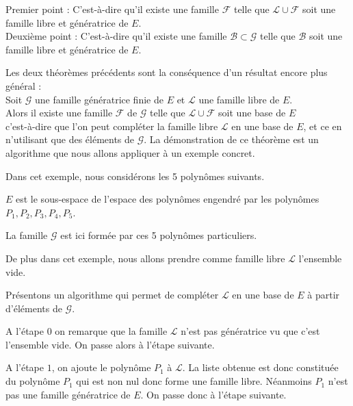 \change
Premier point :
  C'est-à-dire qu'il existe une famille $\mathcal{F}$ telle que 
  $\mathcal{L} \cup \mathcal{F}$ soit une famille libre et génératrice de $E$.\\
  
  
\change
Deuxième point :
  C'est-à-dire qu'il existe une famille $\mathcal{B} \subset \mathcal{G}$ telle que 
  $\mathcal{B}$ soit une famille libre et génératrice de $E$.

\diapo
Les deux théorèmes précédents sont la conséquence d'un résultat encore plus général :\\

Soit $\mathcal{G}$ une famille génératrice finie de $E$ 
et $\mathcal{L}$ une famille libre de $E$. \\

Alors il existe une famille $\mathcal{F}$ de $\mathcal{G}$ telle que
$\mathcal{L} \cup \mathcal{F}$ soit une base de $E$\\

c'est-à-dire que l'on peut compléter la famille libre $\mathcal{L}$ en une base de $E$, et ce en n'utilisant que des éléments de $\mathcal{G}$.
La démonstration de ce théorème est un algorithme que nous allons appliquer à un exemple concret.



\diapo

Dans cet exemple, nous considérons les 5 polynômes suivants.

\change
$E$ est le sous-espace de l'espace des polynômes engendré par les polynômes  
$P_1, P_2, P_3, P_4, P_5$.


\change
 La famille $\mathcal{G}$ est ici formée par ces 5 polynômes particuliers.

\change
De plus dans cet exemple, nous allons prendre comme famille libre $\mathcal{L}$ 
l'ensemble vide. 

\change
Présentons un algorithme qui permet de compléter $\mathcal{L}$ en une base de $E$
à partir d'éléments de $\mathcal{G}$.

\change
A l'étape $0$ on remarque que la famille $\mathcal{L}$ n'est pas génératrice vu que c'est l'ensemble vide. On passe alors à l'étape suivante.

\change
A l'étape $1$, on ajoute le polynôme $P_1$ à $\mathcal{L}$. La liste obtenue est donc constituée du polynôme $P_1$ qui est non nul donc forme une famille libre. Néanmoins $P_1$ n'est pas une famille génératrice de $E$. On passe donc à l'étape suivante.

